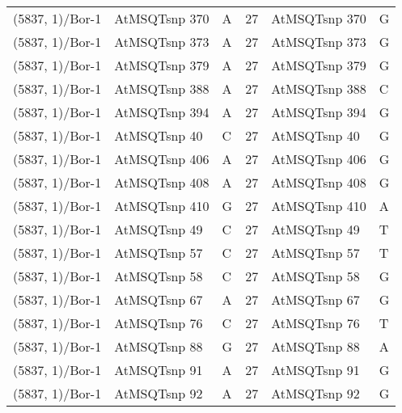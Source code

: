 \begin{center}
\begin{longtable}{|l|l|l|l|l|l|}
(5837, 1)/Bor-1&AtMSQTsnp 370&A&27&AtMSQTsnp 370&G\\
(5837, 1)/Bor-1&AtMSQTsnp 373&A&27&AtMSQTsnp 373&G\\
(5837, 1)/Bor-1&AtMSQTsnp 379&A&27&AtMSQTsnp 379&G\\
(5837, 1)/Bor-1&AtMSQTsnp 388&A&27&AtMSQTsnp 388&C\\
(5837, 1)/Bor-1&AtMSQTsnp 394&A&27&AtMSQTsnp 394&G\\
(5837, 1)/Bor-1&AtMSQTsnp 40&C&27&AtMSQTsnp 40&G\\
(5837, 1)/Bor-1&AtMSQTsnp 406&A&27&AtMSQTsnp 406&G\\
(5837, 1)/Bor-1&AtMSQTsnp 408&A&27&AtMSQTsnp 408&G\\
(5837, 1)/Bor-1&AtMSQTsnp 410&G&27&AtMSQTsnp 410&A\\
(5837, 1)/Bor-1&AtMSQTsnp 49&C&27&AtMSQTsnp 49&T\\
(5837, 1)/Bor-1&AtMSQTsnp 57&C&27&AtMSQTsnp 57&T\\
(5837, 1)/Bor-1&AtMSQTsnp 58&C&27&AtMSQTsnp 58&G\\
(5837, 1)/Bor-1&AtMSQTsnp 67&A&27&AtMSQTsnp 67&G\\
(5837, 1)/Bor-1&AtMSQTsnp 76&C&27&AtMSQTsnp 76&T\\
(5837, 1)/Bor-1&AtMSQTsnp 88&G&27&AtMSQTsnp 88&A\\
(5837, 1)/Bor-1&AtMSQTsnp 91&A&27&AtMSQTsnp 91&G\\
(5837, 1)/Bor-1&AtMSQTsnp 92&A&27&AtMSQTsnp 92&G\\
\hline
\end{longtable}
\end{center}

